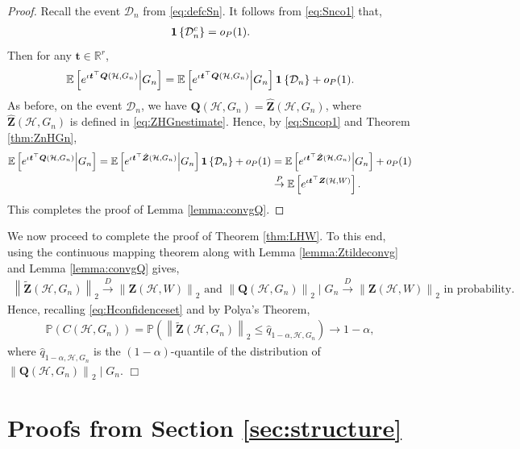 \documentclass[11pt,reqno]{amsart}
\numberwithin{equation}{section}
\newcommand{\one}{{\bf 1}}
\newcommand{\R}{{\mathbb R}}
\newcommand{\E}{\mathbb{E}}
\newcommand{\cH}{{\mathcal H}}
\newcommand\dto{\overset{D}{\rightarrow}}
\theoremstyle{definition}
\begin{document}
\begin{proof}
Recall the event $\mathcal{D}_n$ from \eqref{eq:defcSn}. It follows from \eqref{eq:Snco1} that,
\begin{align}\label{eq:Sncop1}
    \one\left\{\mathcal{D}_n^c\right\} = o_P(1).
\end{align}
Then for any $\bm t\in \R^r$,
\begin{align*}
    \E\left[e^{\iota \bm t^{\top}\bm Q(\cH, G_n)} \middle| G_n \right] = \E\left[e^{\iota \bm t^{\top}\bm Q(\cH, G_n)}\middle|G_n\right]\one\left\{\mathcal{D}_n\right\} + o_P(1) . 
\end{align*} 
As before, on the event $\mathcal{D}_n$, we have $\bm Q(\cH,G_n) = \hat{\bm Z}(\cH, G_n)$, where $\hat{\bm Z}(\cH, G_n)$ is defined in \eqref{eq:ZHGnestimate}. Hence, by \eqref{eq:Sncop1} and Theorem \ref{thm:ZnHGn}, 
\begin{align*}
    \E\left[e^{\iota \bm t^{\top}\bm Q(\cH, G_n)} \middle| G_n \right] 
     = \E\left[ e^{ \iota \bm t^{\top}\hat{\bm Z}(\cH, G_n) } \middle|G_n\right]\one\left\{\mathcal{D}_n\right\} + o_P(1) & = \E\left[ e^{ \iota \bm t^{\top}\hat{\bm Z}(\cH, G_n) } \middle|G_n\right] + o_P(1) \\ 
     & \overset{P} \rightarrow \E\left[ e^{ \iota \bm t^{\top} \bm Z(\cH, W) } \right] . 
\end{align*} 
This completes the proof of Lemma \ref{lemma:convgQ}.

\end{proof}
We now proceed to complete the proof of Theorem \ref{thm:LHW}. To this end, using the continuous mapping theorem along with Lemma  \ref{lemma:Ztildeconvg} and Lemma \ref{lemma:convgQ} gives,
\begin{align*}
    \left\|\tilde{\bm Z}(\cH, G_{n})\right\|_{2}\dto \left\|\bm Z(\cH,W)\right\|_{2}\text{ and }\left\|\bm Q(\cH, G_n)\right\|_{2}\mid G_{n}\dto \left\|\bm Z(\cH,W)\right\|_{2}\text{ in probability.}
\end{align*}
Hence, recalling \eqref{eq:Hconfidenceset} and by Polya's Theorem, 
\begin{align*}
   \mathbb P( C(\cH, G_n) ) =  \mathbb P\left(\left\|\tilde{\bm Z}(\cH, G_{n})\right\|_{2}\leq\hat{q}_{1-\alpha,\cH,G_{n}}\right)  \rightarrow 1-\alpha , 
   \end{align*}
where $\hat{q}_{1-\alpha,\cH,G_{n}}$ is the $(1-\alpha)$-quantile of the distribution of $\left\|\bm Q(\cH, G_n)\right\|_{2}\mid G_{n}$. \hfill $\Box$

\section{Proofs from Section \ref{sec:structure}} 
\label{sec:structurepf}
\end{document}
